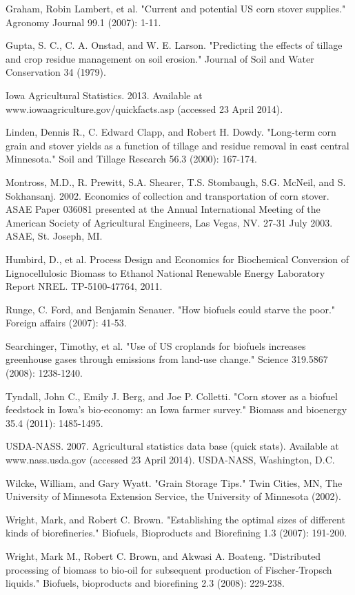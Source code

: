 \documentclass[12pt]{article}\usepackage[]{graphicx}\usepackage[]{color}
\begin{document}
\begin{thebibliography}{25}

 Graham, Robin Lambert, et al. "Current and potential US corn stover supplies." Agronomy Journal 99.1 (2007): 1-11.

 Gupta, S. C., C. A. Onstad, and W. E. Larson. "Predicting the effects of tillage and crop residue management on soil erosion." Journal of Soil and Water Conservation 34 (1979).

 Iowa Agricultural Statistics. 2013.  Available at www.iowaagriculture.gov/quickfacts.asp (accessed 23 April 2014).

 Linden, Dennis R., C. Edward Clapp, and Robert H. Dowdy. "Long-term corn grain and stover yields as a function of tillage and residue removal in east central Minnesota." Soil and Tillage Research 56.3 (2000): 167-174.

 Montross, M.D., R. Prewitt, S.A. Shearer, T.S. Stombaugh, S.G. McNeil, and S. Sokhansanj.  2002.  Economics of collection and transportation of corn stover.  ASAE Paper 036081 presented at the Annual International Meeting of the American Society of Agricultural Engineers, Las Vegas, NV. 27-31 July 2003.  ASAE, St. Joseph, MI.

 Humbird, D., et al. Process Design and Economics for Biochemical Conversion of Lignocellulosic Biomass to Ethanol National Renewable Energy Laboratory Report NREL. TP-5100-47764, 2011.

 Runge, C. Ford, and Benjamin Senauer. "How biofuels could starve the poor." Foreign affairs (2007): 41-53.

 Searchinger, Timothy, et al. "Use of US croplands for biofuels increases greenhouse gases through emissions from land-use change." Science 319.5867 (2008): 1238-1240.

 Tyndall, John C., Emily J. Berg, and Joe P. Colletti. "Corn stover as a biofuel feedstock in Iowa’s bio-economy: an Iowa farmer survey." Biomass and bioenergy 35.4 (2011): 1485-1495.

 USDA-NASS. 2007.  Agricultural statistics data base (quick stats).  Available at www.nass.usda.gov (accessed 23 April 2014).  USDA-NASS, Washington, D.C.

 Wilcke, William, and Gary Wyatt. "Grain Storage Tips." Twin Cities, MN, The University of Minnesota Extension Service, the University of Minnesota (2002).

 Wright, Mark, and Robert C. Brown. "Establishing the optimal sizes of different kinds of biorefineries." Biofuels, Bioproducts and Biorefining 1.3 (2007): 191-200.

  Wright, Mark M., Robert C. Brown, and Akwasi A. Boateng. "Distributed processing of biomass to bio‐oil for subsequent production of Fischer‐Tropsch liquids." Biofuels, bioproducts and biorefining 2.3 (2008): 229-238.

\end{thebibliography}
\end{document}
